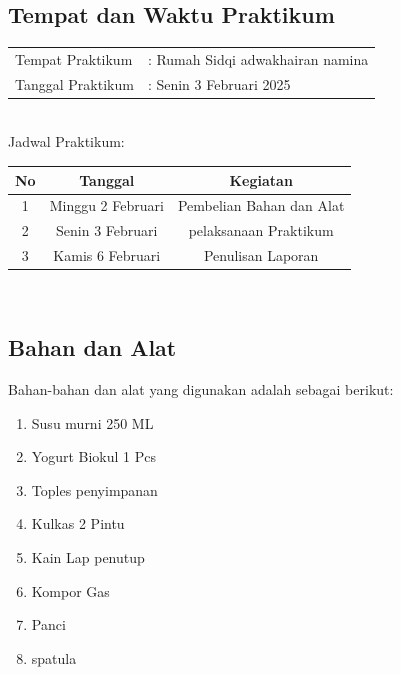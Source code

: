 \documentclass[a4paper,12pt, left=3cm,right=2cm,bottom=2cm, bahasa]{article}
\begin{document}
\subsection{Tempat dan Waktu Praktikum}
\begin{tabular}{ll}
    Tempat Praktikum & : Rumah Sidqi adwakhairan namina \\
    Tanggal Praktikum & : Senin 3 Februari 2025 \\
  \end{tabular}\\

Jadwal Praktikum: 
\begin{center}
  \begin{table}[H]
  \begin{tabular}{|c|c|c|}
    \hline
    No & Tanggal & Kegiatan \\
    \hline
    1 & Minggu 2 Februari & Pembelian Bahan dan Alat \\
    2 & Senin 3 Februari & pelaksanaan Praktikum \\ 
    3 & Kamis 6 Februari & Penulisan Laporan \\
    \hline
  \end{tabular}\\
\end{table}
\end{center}


\subsection{Bahan dan Alat}
Bahan-bahan dan alat yang digunakan adalah sebagai berikut:
\begin{enumerate}
  \item Susu murni 250 ML
  \item Yogurt Biokul 1 Pcs
  \item Toples penyimpanan
  \item Kulkas 2 Pintu
  \item Kain Lap penutup
  \item Kompor Gas
  \item Panci
  \item spatula
\end{enumerate}
\pagebreak
\end{document}
